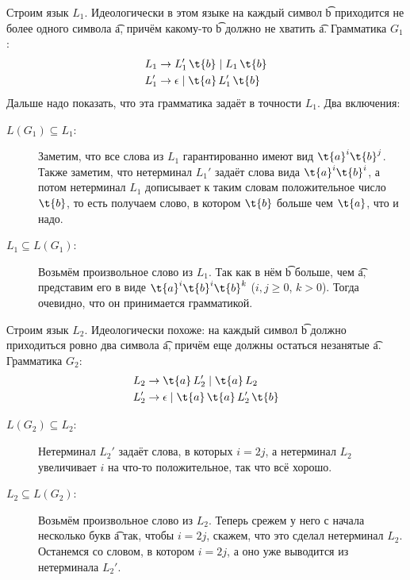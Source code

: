 	Строим язык $L_1$.
	Идеологически в этом языке на каждый символ \t{b} приходится не более одного символа \t{a},
	причём какому-то \t{b} должно не хватить \t{a}.
	Грамматика $G_1$:
	\begin{align*}
		L_1 &\to L_1'\, \t{b} \mid L_1 \, \t{b} \\
		L_1' &\to \epsilon \mid \t{a}\,L_1'\,\t{b}
	\end{align*}
	Дальше надо показать, что эта грамматика задаёт в точности $L_1$.
	Два включения:
	\begin{description}
		\item[$L(G_1) \subseteq L_1$:]
			Заметим, что все слова из $L_1$ гарантированно имеют вид $\t{a}^i\t{b}^j$.
			Также заметим, что нетерминал $L_1'$ задаёт слова вида $\t{a}^i\t{b}^i$, а потом
			нетерминал $L_1$ дописывает к таким словам положительное число $\t{b}$, то
			есть получаем слово, в котором $\t{b}$ больше чем $\t{a}$, что и надо.
		\item[$L_1 \subseteq L(G_1)$:]
			Возьмём произвольное слово из $L_1$.
			Так как в нём \t{b} больше, чем \t{a}, представим его в виде $\t{a}^i\t{b}^i\t{b}^k$ ($i, j \ge 0$, $k > 0$).
			Тогда очевидно, что он принимается грамматикой.
	\end{description}

	Строим язык $L_2$.
	Идеологически похоже: на каждый символ \t{b} должно приходиться ровно два символа \t{a},
	причём еще должны остаться незанятые \t{a}.
	Грамматика $G_2$:
	\begin{align*}
		L_2 &\to \t{a}\,L_2' \mid \t{a}\,L_2 \\
		L_2' &\to \epsilon \mid \t{a}\,\t{a}\,L_2'\,\t{b}
	\end{align*}
	\begin{description}
		\item[$L(G_2) \subseteq L_2$:]
			Нетерминал $L_2'$ задаёт слова, в которых $i = 2j$, а нетерминал $L_2$
			увеличивает $i$ на что-то положительное, так что всё хорошо.
		\item[$L_2 \subseteq L(G_2)$:]
			Возьмём произвольное слово из $L_2$.
			Теперь срежем у него с начала несколько букв \t{a} так, чтобы $i=2j$, скажем, что это сделал нетерминал $L_2$.
			Останемся со словом, в котором $i=2j$, а оно уже выводится из нетерминала $L_2'$.
	\end{description}

